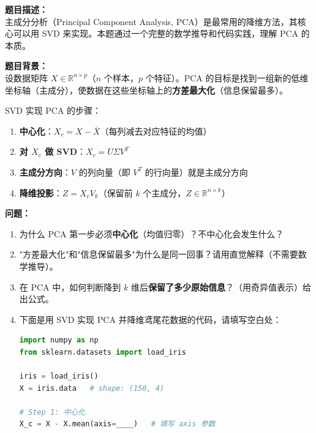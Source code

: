\documentclass[a4paper,11pt]{ctexart}
\begin{document}
\begin{problembox}
    \textbf{题目描述：}\\
    主成分分析（Principal Component Analysis, PCA）是最常用的降维方法，其核心可以用 SVD 来实现。本题通过一个完整的数学推导和代码实践，理解 PCA 的本质。

    \vspace{0.3cm}
    \textbf{题目背景：}\\
    设数据矩阵 $X \in \mathbb{R}^{n \times p}$（$n$ 个样本，$p$ 个特征）。PCA 的目标是找到一组新的低维坐标轴（主成分），使数据在这些坐标轴上的\textbf{方差最大化}（信息保留最多）。

    SVD 实现 PCA 的步骤：
    \begin{enumerate}
        \item \textbf{中心化}：$X_c = X - \bar{X}$（每列减去对应特征的均值）
        \item \textbf{对 $X_c$ 做 SVD}：$X_c = U \Sigma V^T$
        \item \textbf{主成分方向}：$V$ 的列向量（即 $V^T$ 的行向量）就是主成分方向
        \item \textbf{降维投影}：$Z = X_c V_k$（保留前 $k$ 个主成分，$Z \in \mathbb{R}^{n \times k}$）
    \end{enumerate}

    \textbf{问题：}
    \begin{enumerate}[(1)]
        \item 为什么 PCA 第一步必须\textbf{中心化}（均值归零）？不中心化会发生什么？

        \item "方差最大化"和"信息保留最多"为什么是同一回事？请用直觉解释（不需要数学推导）。

        \item 在 PCA 中，如何判断降到 $k$ 维后\textbf{保留了多少原始信息}？（用奇异值表示）给出公式。

        \item 下面是用 SVD 实现 PCA 并降维鸢尾花数据的代码，请填写空白处：

        \begin{lstlisting}[language=Python]
import numpy as np
from sklearn.datasets import load_iris

iris = load_iris()
X = iris.data   # shape: (150, 4)

# Step 1: 中心化
X_c = X - X.mean(axis=____)   # 填写 axis 参数


\end{lstlisting}
\end{enumerate}
\end{problembox}
\end{document}
